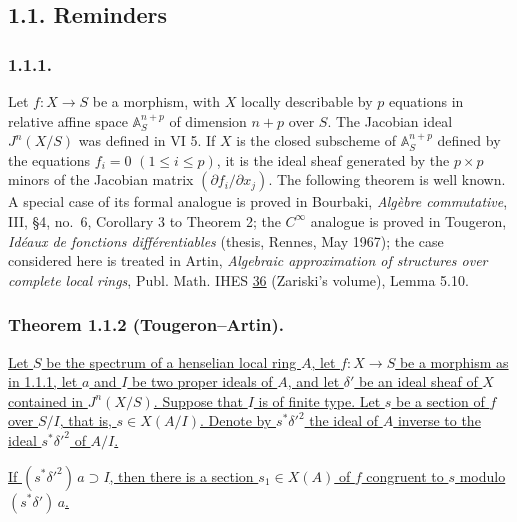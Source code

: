 \subsection*{1.1. Reminders}

\subsubsection*{1.1.1.}
Let $f:X\longrightarrow S$ be a morphism, with $X$ locally
describable by $p$ equations in relative affine space
$\mathbb A_S^{n+p}$ of dimension $n+p$ over $S$.  The Jacobian ideal
$J^n(X/S)$ was defined in VI 5.  If $X$ is the closed subscheme of
$\mathbb A_S^{n+p}$ defined by the equations
$f_i=0$ $(1\leq i\leq p)$, it is the ideal sheaf generated by the
$p\times p$ minors of the Jacobian matrix
$(\partial f_i/\partial x_j)$.  The following theorem is well known.
A special case of its formal analogue is proved in Bourbaki,
\emph{Alg\`ebre commutative}, III, \S4, no.~6, Corollary 3 to
Theorem 2; the $C^\infty$ analogue is proved in Tougeron,
\emph{Id\'eaux de fonctions diff\'erentiables} (thesis, Rennes,
May 1967); the case considered here is treated in Artin,
\emph{Algebraic approximation of structures over complete local
rings}, Publ. Math. IHES \underline{36} (Zariski's volume),
Lemma 5.10.

\subsubsection*{Theorem 1.1.2 (Tougeron--Artin).}
\underline{Let $S$ be the spectrum of a henselian local ring $A$,
let $f:X\to S$ be a morphism as in 1.1.1, let $a$ and $I$ be two
proper ideals of $A$, and let $\delta'$ be an ideal sheaf of $X$
contained in $J^n(X/S)$.  Suppose that $I$ is of finite type.  Let
$s$ be a section of $f$ over $S/I$, that is, $s\in X(A/I)$.  Denote
by $s^*\delta'^2$ the ideal of $A$ inverse to the ideal
$s^*\delta'^2$ of $A/I$.}

\underline{If $(s^*\delta'^2)\,a\supset I$, then there is a section
$s_1\in X(A)$ of $f$ congruent to $s$ modulo
$(s^*\delta')\,a$.}

